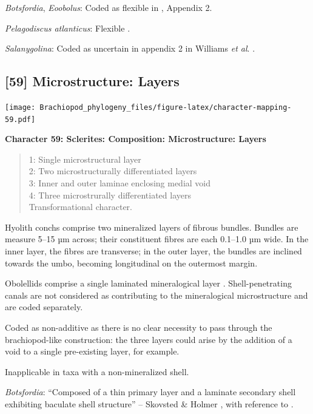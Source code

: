 \documentclass[openany]{book}
\theoremstyle{definition}
\theoremstyle{definition}
\theoremstyle{definition}
\theoremstyle{remark}
\begin{document}
\hypertarget{Botsfordia-coding-58}{}
\emph{Botsfordia}, \emph{Eoobolus}: Coded as flexible in
\citet{Williams1998Thediversity}, Appendix 2.

\hypertarget{Pelagodiscus_atlanticus-coding-58}{}
\emph{Pelagodiscus atlanticus}: Flexible
\citep{Williams1998Thediversity}.

\hypertarget{Salanygolina-coding-58}{}
\emph{Salanygolina}: Coded as uncertain in appendix 2 in Williams
\emph{et al}. \citeyearpar{Williams1998Thediversity}.

\subsection*{{[}59{]} Microstructure:
Layers}\label{microstructure-layers}

\texttt{[image: Brachiopod\_phylogeny\_files/figure-latex/character-mapping-59.pdf]}

\textbf{Character 59: Sclerites: Composition: Microstructure: Layers}

\begin{quote}
1: Single microstructural layer\\
2: Two microstructurally differentiated layers\\
3: Inner and outer laminae enclosing medial void\\
4: Three microstrurally differentiated layers\\
Transformational character.
\end{quote}

Hyolith conchs comprise two mineralized layers of fibrous bundles.
Bundles are measure 5--15 µm across; their constituent fibres are each
0.1--1.0 µm wide. In the inner layer, the fibres are transverse; in the
outer layer, the bundles are inclined towards the umbo, becoming
longitudinal on the outermost margin.

Obolellids comprise a single laminated mineralogical layer
\citep{Balthasar2008iMummpikia}. Shell-penetrating canals are not
considered as contributing to the mineralogical microstructure and are
coded separately.

Coded as non-additive as there is no clear necessity to pass through the
brachiopod-like construction: the three layers could arise by the
addition of a void to a single pre-existing layer, for example.

Inapplicable in taxa with a non-mineralized shell.

\hypertarget{Botsfordia-coding-59}{}
\emph{Botsfordia}: ``Composed of a thin primary layer and a laminate
secondary shell exhibiting baculate shell structure'' -- Skovsted \&
Holmer \citeyearpar{Skovsted2005EarlyCambrian}, with reference to
\citet{Skovsted2003EarlyCambrian}.
\end{document}
